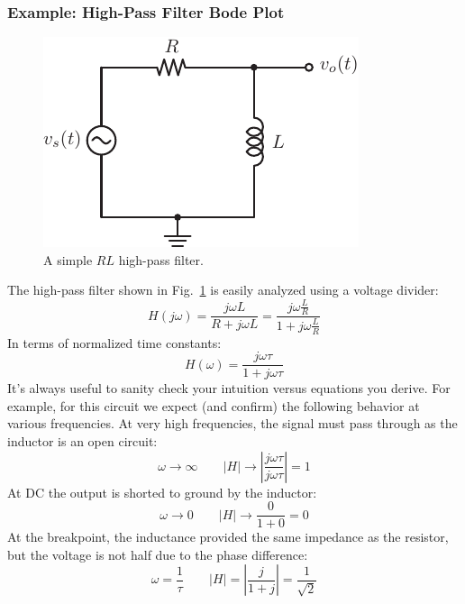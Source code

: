\subsubsection{Example: High-Pass Filter Bode Plot}
\begin{figure}[tb]
\centering
\includegraphics[angle=-0.0,width=.4\columnwidth]{mod1_3_8_rl_hpf}
\caption{A simple $RL$ high-pass filter.}
\label{fig:hpf}
\end{figure}
The high-pass filter shown in Fig.~\ref{fig:hpf}  is easily analyzed using a voltage divider:
    \begin{equation}
        H(j\omega ) = \frac{{j\omega L}}{{R + j\omega L}} = \frac{{j\omega \frac{L}{R}}}{{1 + j\omega \frac{L}{R}}}
    \end{equation}
In terms of normalized time constants:
    \begin{equation}
        H(\omega ) = \frac{{j\omega \tau }}{{1 + j\omega \tau }}
    \end{equation}
It's always useful to sanity check your intuition versus equations you derive.  For example, for this circuit we expect (and confirm) the following behavior at various frequencies.  At very high frequencies, the signal must pass through as the inductor is an open circuit:
    \begin{equation}
        \omega  \to \infty  \quad\quad  \left| H \right| \to \left| {\frac{{j\omega \tau }}{{j\omega \tau }}} \right| = 1
    \end{equation}
At DC the output is shorted to ground by the inductor:
    \begin{equation}
        \omega  \to 0  \quad\quad \left| H \right| \to \frac{0}{{1 + 0}} = 0
    \end{equation}
At the breakpoint, the inductance provided the same impedance as the resistor, but the voltage is not half due to the phase difference:
    \begin{equation}
        \omega  = \frac{1}{\tau }  \quad\quad  \left| H \right| = \left| {\frac{j}{{1 + j}}} \right| = \frac{1}{{\sqrt 2 }}
    \end{equation}
